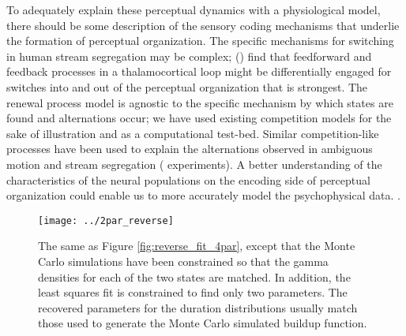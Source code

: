 To adequately explain these perceptual dynamics with a physiological model, there should be some description of the sensory coding mechanisms that underlie the formation of perceptual organization. The specific mechanisms for switching in human stream segregation may be complex; (\cite{Kondo2009}) find that feedforward and feedback processes in a thalamocortical loop might be differentially engaged for switches into and out of the perceptual organization that is strongest. The renewal process model is agnostic to the specific mechanism by which states are found and alternations occur; we have used existing competition models for the sake of illustration and as a computational test-bed. Similar competition-like processes have been used to explain the alternations observed in ambiguous motion \cite{Pastukhov2013} and stream segregation (\cite{Mill2013} experiments). A better understanding of the characteristics of the neural populations on the encoding side of perceptual organization could enable us to more accurately model the psychophysical data.
 .


\begin{wrapfigure}{L}{0.6\textwidth}
	\centering
	\texttt{[image: ../2par\_reverse]}
	\caption{The same as Figure \ref{fig:reverse_fit_4par}, except that the Monte Carlo simulations have been constrained so that the gamma densities for each of the two states are matched. In addition, the least squares fit is constrained to find only two parameters. The recovered parameters for the duration distributions usually match those used to generate the Monte Carlo simulated buildup function.}
	\label{fig:2par_reverse_fit}
\end{wrapfigure}



